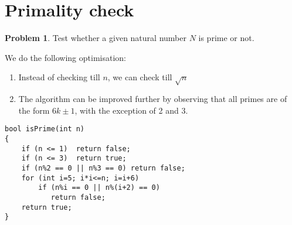 \documentclass[twoside,12pt,a4paper,english]{book}
\theoremstyle{definition}
\theoremstyle{problemstyle}
\newtheorem*{problem}{Problem} %
\theoremstyle{problemstyle}
\theoremstyle{problemstyle}
\begin{document}
\section{Primality check}
\begin{problem}
Test whether a given natural number $N$ is prime or not.
\end{problem}
\begin{tcolorbox}[title=Solution]

We do the following optimisation:
\begin{enumerate}
    \item Instead of checking till $n$, we can check till $\sqrt{n}$
    \item The algorithm can be improved further by observing that all primes are of the form $6k \pm 1$, with the exception of 2 and 3.
\end{enumerate}
\begin{lstlisting}
bool isPrime(int n)
{
    if (n <= 1)  return false;
    if (n <= 3)  return true;
    if (n%2 == 0 || n%3 == 0) return false;
    for (int i=5; i*i<=n; i=i+6)
        if (n%i == 0 || n%(i+2) == 0)
           return false;
    return true;
}
\end{lstlisting}
\end{tcolorbox}
\end{document}
